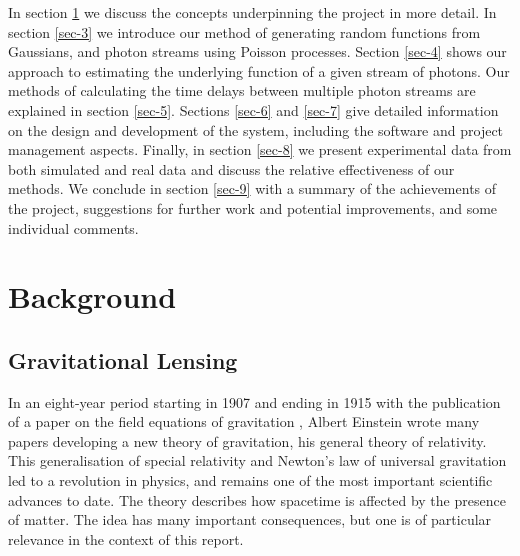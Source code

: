 \documentclass[a4paper,11pt,twoside]{article}
\begin{document}
  In section \ref{sec-2} we discuss the concepts underpinning the project in more
  detail. In section \ref{sec-3} we introduce our method of
  generating random functions from Gaussians, and photon streams using Poisson
  processes. Section \ref{sec-4} shows our approach to estimating the
  underlying function of a given stream of photons. Our methods of calculating
  the time delays between multiple photon streams are explained in section
  \ref{sec-5}. Sections \ref{sec-6} and \ref{sec-7} give detailed
  information on the design and development of the system, including the
  software and project management aspects. Finally, in section \ref{sec-8}
  we present experimental data from both simulated and real data and discuss the
  relative effectiveness of our methods. We conclude in section \ref{sec-9} with
  a summary of the achievements of the project, suggestions for further work and
  potential improvements, and some individual comments.
\section{Background}
\label{sec-2}
\subsection{Gravitational Lensing}
\label{sec-2-1}

   In an eight-year period starting in 1907 and ending in 1915 with the
   publication of a paper on the field equations of gravitation
   \cite{einstein1915general}, Albert Einstein wrote many papers developing a
   new theory of gravitation, his general theory of relativity. This
   generalisation of special relativity and Newton's law of universal
   gravitation led to a revolution in physics, and remains one of the most
   important scientific advances to date. The theory describes how spacetime is
   affected by the presence of matter. The idea has many important consequences,
   but one is of particular relevance in the context of this report.
\end{document}
